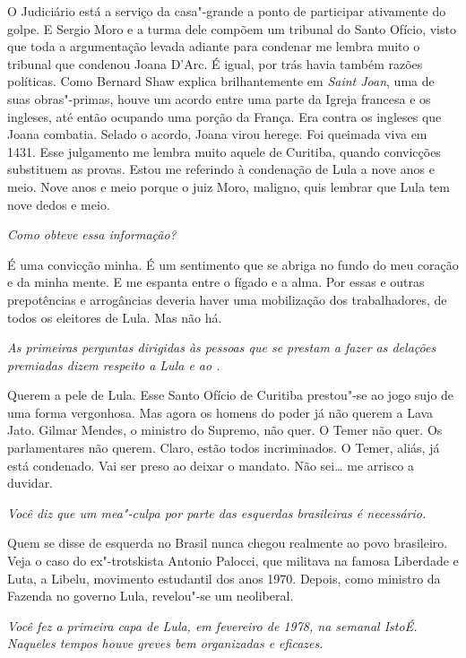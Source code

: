 \normalfont
O Judiciário está a serviço da casa"-grande a ponto de
participar ativamente do golpe. E Sergio Moro e a turma dele compõem um
tribunal do Santo Ofício, visto que toda a argumentação levada adiante
para condenar me lembra muito o tribunal que condenou Joana D'Arc. É
igual, por trás havia também razões políticas. Como Bernard Shaw explica
brilhantemente em \emph{Saint Joan}, uma de suas obras"-primas, houve um
acordo entre uma parte da Igreja francesa e os ingleses, até então
ocupando uma porção da França. Era contra os ingleses que Joana
combatia. Selado o acordo, Joana virou herege. Foi queimada viva em
1431. Esse julgamento me lembra muito aquele de Curitiba, quando
convicções substituem as provas. Estou me referindo à condenação de Lula
a nove anos e meio. Nove anos e meio porque o juiz Moro, maligno, quis
lembrar que Lula tem nove dedos e meio.

\itshape
 Como obteve essa informação?

\normalfont
É uma convicção minha. É um sentimento que se abriga no
fundo do meu coração e da minha mente. E me espanta entre o fígado e a
alma. Por essas e outras prepotências e arrogâncias deveria haver uma
mobilização dos trabalhadores, de todos os eleitores de Lula. Mas não
há.

\itshape
 As primeiras perguntas dirigidas às pessoas que se
prestam a fazer as delações premiadas dizem respeito a Lula e ao .

\normalfont
Querem a pele de Lula. Esse Santo Ofício de Curitiba
prestou"-se ao jogo sujo de uma forma vergonhosa. Mas agora os homens do
poder já não querem a Lava Jato. Gilmar Mendes, o ministro do Supremo,
não quer. O Temer não quer. Os parlamentares não querem. Claro, estão
todos incriminados. O Temer, aliás, já está condenado. Vai ser preso ao
deixar o mandato. Não sei… me arrisco a duvidar.

\itshape
 Você diz que um \emph{mea"-culpa} por parte das
esquerdas brasileiras é necessário.

\normalfont
Quem se disse de esquerda no Brasil nunca chegou
realmente ao povo brasileiro. Veja o caso do ex"-trotskista Antonio
Palocci, que militava na famosa Liberdade e Luta, a Libelu, movimento
estudantil dos anos 1970. Depois, como ministro da Fazenda no governo
Lula, revelou"-se um neoliberal.

\itshape
 Você fez a primeira capa de Lula, em fevereiro de 1978,
na semanal \emph{IstoÉ}. Naqueles tempos houve greves bem organizadas e
eficazes.


